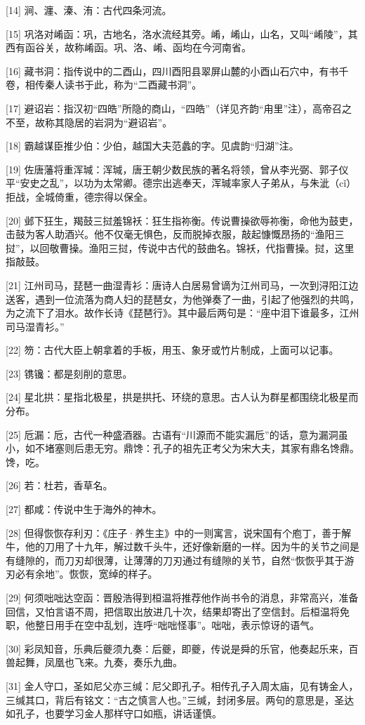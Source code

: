 \documentclass[12pt,UTF8]{ctexbook}
\begin{document}
[14] 涧、瀍、溱、洧：古代四条河流。

[15] 巩洛对崤函：巩，古地名，洛水流经其旁。崤，崤山，山名，又叫“崤陵”，其西有函谷关，故称崤函。巩、洛、崤、函均在今河南省。

[16] 藏书洞：指传说中的二酉山，四川酉阳县翠屏山麓的小酉山石穴中，有书千卷，相传秦人读书于此，称为“二酉藏书洞”。

[17] 避诏岩：指汉初“四皓”所隐的商山，“四皓”（详见齐韵“甪里”注），高帝召之不至，故称其隐居的岩洞为“避诏岩”。

[18] 霸越谋臣推少伯：少伯，越国大夫范蠡的字。见虞韵“归湖”注。

[19] 佐唐藩将重浑瑊：浑瑊，唐王朝少数民族的著名将领，曾从李光弼、郭子仪平“安史之乱”，以功为太常卿。德宗出逃奉天，浑瑊率家人子弟从，与朱泚（cǐ）拒战，全城倚重，德宗得以保全。

[20] 邺下狂生，羯鼓三挝羞锦袄：狂生指祢衡。传说曹操欲辱祢衡，命他为鼓吏，击鼓为客人助酒兴。他不仅毫无惧色，反而脱掉衣服，敲起慷慨昂扬的“渔阳三挝”，以回敬曹操。渔阳三挝，传说中古代的鼓曲名。锦袄，代指曹操。挝，这里指敲鼓。

[21] 江州司马，琵琶一曲湿青衫：唐诗人白居易曾谪为江州司马，一次到浔阳江边送客，遇到一位流落为商人妇的琵琶女，为他弹奏了一曲，引起了他强烈的共鸣，为之流下了泪水。故作长诗《琵琶行》。其中最后两句是：“座中泪下谁最多，江州司马湿青衫。”

[22] 笏：古代大臣上朝拿着的手板，用玉、象牙或竹片制成，上面可以记事。

[23] 镌镵：都是刻削的意思。

[24] 星北拱：星指北极星，拱是拱托、环绕的意思。古人认为群星都围绕北极星而分布。

[25] 卮漏：卮，古代一种盛酒器。古语有“川源而不能实漏卮”的话，意为漏洞虽小，如不堵塞则后患无穷。鼎馋：孔子的祖先正考父为宋大夫，其家有鼎名馋鼎。馋，吃。

[26] 若：杜若，香草名。

[27] 都咸：传说中生于海外的神木。

[28] 但得恢恢存利刃：《庄子·养生主》中的一则寓言，说宋国有个庖丁，善于解牛，他的刀用了十九年，解过数千头牛，还好像新磨的一样。因为牛的关节之间是有缝隙的，而刀刃却很薄，让薄薄的刀刃通过有缝隙的关节，自然“恢恢乎其于游刃必有余地”。恢恢，宽绰的样子。

[29] 何须咄咄达空函：晋殷浩得到桓温将推荐他作尚书令的消息，非常高兴，准备回信，又怕言语不周，把信取出放进几十次，结果却寄出了空信封。后桓温将免职，他整日用手在空中乱划，连呼“咄咄怪事”。咄咄，表示惊讶的语气。

[30] 彩凤知音，乐典后夔须九奏：后夔，即夔，传说是舜的乐官，他奏起乐来，百兽起舞，凤凰也飞来。九奏，奏乐九曲。

[31] 金人守口，圣如尼父亦三缄：尼父即孔子。相传孔子入周太庙，见有铸金人，三缄其口，背后有铭文：“古之慎言人也。”三缄，封闭多层。两句的意思是，圣达如孔子，也要学习金人那样守口如瓶，讲话谨慎。

\backmatter
\end{document}

